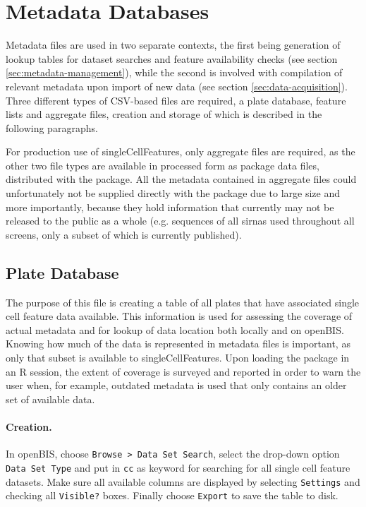 \section{Metadata Databases}
\label{sec:update-metadata}
Metadata files are used in two separate contexts, the first being generation of lookup tables for dataset searches and feature availability checks (see section \ref{sec:metadata-management}), while the second is involved with compilation of relevant metadata upon import of new data (see section \ref{sec:data-acquisition}). Three different types of CSV-based files are required, a plate database, feature lists and aggregate files, creation and storage of which is described in the following paragraphs.

For production use of singleCellFeatures, only aggregate files are required, as the other two file types are available in processed form as package data files, distributed with the package. All the metadata contained in aggregate files could unfortunately not be supplied directly with the package due to large size and more importantly, because they hold information that currently may not be released to the public as a whole (e.g. sequences of all \glspl{sirna} used throughout all screens, only a subset of which is currently published).

\subsection{Plate Database}
\label{sec:plate-database}
The purpose of this file is creating a table of all plates that have associated single cell feature data available. This information is used for assessing the coverage of actual metadata and for lookup of data location both locally and on openBIS. Knowing how much of the data is represented in metadata files is important, as only that subset is available to singleCellFeatures. Upon loading the package in an R session, the extent of coverage is surveyed and reported in order to warn the user when, for example, outdated metadata is used that only contains an older set of available data.

\paragraph{Creation.}
In openBIS, choose \texttt{Browse > Data Set Search}, select the drop-down option \texttt{Data Set Type} and put in \texttt{cc} as keyword for searching for all single cell feature datasets. Make sure all available columns are displayed by selecting \texttt{Settings} and checking all \texttt{Visible?} boxes. Finally choose \texttt{Export} to save the table to disk.

